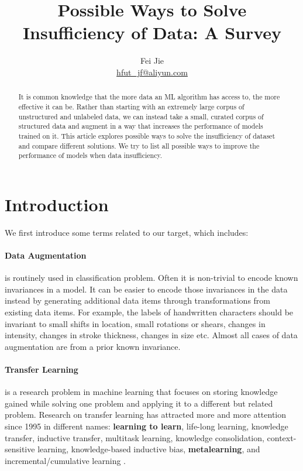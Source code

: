 \documentclass{article}
\title{Possible Ways to Solve Insufficiency of Data: A Survey}
\author{Fei Jie \\ \href{mailto:hfut\_jf@aliyun.com}{hfut\_jf@aliyun.com}}
\begin{document}
\maketitle
\thispagestyle{firstpage}

\begin{abstract}
It is common knowledge that the more data an ML algorithm has access to, the more effective it can be. Rather than starting with an extremely large corpus of unstructured and unlabeled data, we can instead take a small, curated corpus of structured data and augment in a way that increases the performance of models trained on it. This article explores possible ways to solve the insufficiency of dataset and compare different solutions. We try to list all possible ways to improve the performance of models when data insufficiency.
\end{abstract}

\section{Introduction}

We first introduce some terms related to our target, which includes:

\paragraph{Data Augmentation} \cite{krizhevsky2012imagenet} is routinely used in classification problem. Often it is non-trivial to encode known invariances in a model. It can be easier to encode those invariances in the data instead by generating additional data items through transformations from existing data items. For example, the labels of handwritten characters should be invariant to small shifts in location, small rotations or shears, changes in intensity, changes in stroke thickness, changes in size etc. Almost all cases of data augmentation are from a prior known invariance.

\paragraph{Transfer Learning} is a research problem in machine learning that focuses on storing knowledge gained while solving one problem and applying it to a different but related problem. Research on transfer learning has attracted more and more attention since 1995 in different names: \textbf{learning to learn}, life-long learning, knowledge transfer, inductive transfer, multitask learning, knowledge consolidation, context-sensitive learning, knowledge-based inductive bias, \textbf{metalearning}, and incremental/cumulative learning \cite{pan2010survey}.
\end{document}
